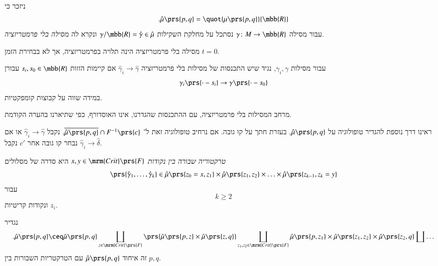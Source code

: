 \documentclass[a4paper,10pt,twoside,openany]{book}
\begin{document}
\begin{definition}
ניזכר כי
\[\text{.} \hat{\mu}\prs{p,q} = \quot{\mu\prs{p,q}}{\mbb{R}}\]
עבור מסילה
$\gamma \colon M \to \mbb{R}$
נסתכל על מחלקת השקילות
$\gamma/\mbb{R} = \hat{\gamma} \in \hat{\mu}$
ונקרא לה
\emph{מסילה בלי פרמטריזציה}.
\end{definition}

\begin{remark}
מסילה בלי פרמטריזציה הינה תלויה בפרמטריזציה, אך לא בבחירת הזמן
$t=0$.
\end{remark}

\begin{definition}
עבור מסילות
$\gamma_i, \gamma$,
נגיד שיש התכנסות של מסילות בלי פרמטריזציה
$\hat{\gamma}_i \to \hat{\gamma}$
אם קיימות הזזות
$s_i, s_0 \in \mbb{R}$
עבורן
\[\gamma_i\prs{\cdot - s_i} \to \gamma\prs{\cdot - s_0}\]
במידה שווה על קבוצות קומפקטיות.
\end{definition}

\begin{remark}
מרחב המסילות בלי פרמטריזציה, עם ההתכנסות שהגדרנו, אינו האוסדורף, כפי שתיארנו בהערה הקודמת.
\end{remark}

\begin{remark}
ראינו דרך נוספת להגדיר טופולוגיה על
$\hat{\mu}\prs{p,q}$,
בעזרת חתך על קו גובה. אם נרחיב טופולוגיה זאת ל־%
$\overline{\hat{\mu}\prs{p,q}} \cap F^{-1}\prs{c}$,
נקבל
$\hat{\gamma}_i \to \hat{\gamma}$
או אם נבחר קו גובה אחר
$c'$
נקבל
$\hat{\gamma}_i \to \hat{\delta}$.
\end{remark}

\begin{definition}
\emph{טרקטוריה שבורה
בין נקודות
$x,y \in \mrm{Crit}\prs{F}$}
היא סדרה של מסלולים
\[ \prs{\hat{\gamma}_1, \ldots, \hat{\gamma}_k} \in \hat{\mu}\prs{z_0 = x, z_1} \times \hat{\mu}\prs{z_1, z_2} \times \ldots \times \hat{\mu}\prs{z_{k-1}, z_k = y}\]
עבור
$$k \geq 2$$
ונקודות קריטיות
$z_i$.
\end{definition}

\begin{definition}
נגדיר
\begin{align*}
\text{.} \hat{\mu}\prs{p,q} \ceq \hat{\mu}\prs{p,q} \coprod_{z \in \mrm{Crit}\prs{F}} \prs{\hat{\mu}\prs{p,z} \times \hat{\mu}\prs{z,q}} \coprod_{z_1, z_2 \in \mrm{Crit}\prs{F}} \hat{\mu}\prs{p,z_1} \times \hat{\mu}\prs{z_1, z_2} \times \hat{\mu}\prs{z_2, q} \coprod \ldots
\end{align*}
זה איחוד
$\hat{\mu}\prs{p,q}$
עם הטרקטריות השבורות בין
$p,q$.
\end{definition}
\end{document}
